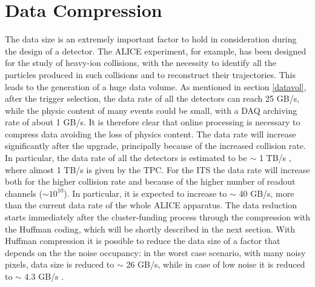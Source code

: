 \section{Data Compression}
The data size is an extremely important factor to hold in consideration during the design of a detector. The ALICE experiment, for example, has been designed for the study of heavy-ion collisions, with the necessity to identify all the particles produced in such collisions and to reconstruct their trajectories. This leads to the generation of a huge data volume. As mentioned in section \ref{datavol}, after the trigger selection, the data rate of all the detectors can reach 25 GB/s, while the physic content of many events could be small, with a DAQ archiving rate of about 1 GB/s. It is therefore clear that online processing is necessary to compress data avoiding the loss of physics content. The data rate will increase significantly after the upgrade, principally because of the increased collision rate. In particular, the data rate of all the detectors is estimated to be $\sim$ 1 TB/s \cite{o2}, where almost 1 TB/s is given by the TPC. For the ITS the data rate will increase both for the higher collision rate and because of the higher number of readout channels ($\sim 10^{10}$). In particular, it is expected to increase to $\sim$ 40 GB/s, more than the current data rate of the whole ALICE apparatus. The data reduction starts immediately after the cluster-funding process through the compression with the Huffman coding, which will be shortly described in the next section. With Huffman compression it is possible to reduce the data size of a factor that depends on the the noise occupancy: in the worst case scenario, with many noisy pixels, data size is reduced to  $\sim$ 26 GB/s, while in case of low noise it is reduced to $\sim$ 4.3 GB/s \cite{o2}.
